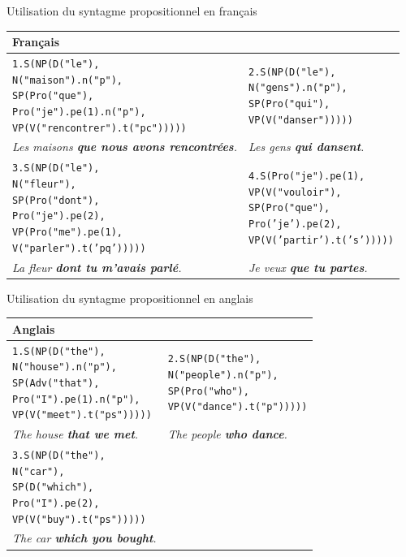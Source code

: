 \documentclass[11pt]{article} %
\newcommand{\real}[1]{\emph{#1}}
\begin{document}
\begin{example}
\caption{Utilisation du syntagme propositionnel en français}
\begin{tabular}{p{8cm} | p{6.2cm}}
\hline 
\textbf{Français} \\
\hline
\begin{alltt}
1.S(NP(D("le"),
       N("maison").n("p"),
       SP(Pro("que"),
          Pro("je").pe(1).n("p"),
          VP(V("rencontrer").t("pc")))))
\end{alltt} &
\begin{alltt}
2.S(NP(D("le"),
       N("gens").n("p"),
       SP(Pro("qui"),
          VP(V("danser")))))
\end{alltt} \\
\real{Les maisons \textbf{que nous avons rencontrées}.} & \real{Les gens \textbf{qui dansent}.} \\
\hline
\begin{alltt}
3.S(NP(D("le"),
       N("fleur"),
       SP(Pro("dont"),
          Pro("je").pe(2),
          VP(Pro("me").pe(1),
             V("parler").t('pq')))))
\end{alltt} &
\begin{alltt}
4.S(Pro("je").pe(1),
    VP(V("vouloir"),
       SP(Pro("que"),
          Pro('je').pe(2),
          VP(V('partir').t('s')))))
\end{alltt} \\
\real{La fleur \textbf{dont tu m'avais parlé}.} & \real{Je veux \textbf{que tu partes}.} \\
\end{tabular}
\label{exPropFr}
\end{example}
\begin{example}
\caption{Utilisation du syntagme propositionnel en anglais}
\begin{tabular}{p{7cm} | p{7cm}}
\hline
\textbf{Anglais} \\
\hline
\begin{alltt}
1.S(NP(D("the"),
       N("house").n("p"),
       SP(Adv("that"),
          Pro("I").pe(1).n("p"),
          VP(V("meet").t("ps")))))
\end{alltt} &
\begin{alltt}
2.S(NP(D("the"),
       N("people").n("p"),
       SP(Pro("who"),
          VP(V("dance").t("p")))))
\end{alltt} \\
\real{The house \textbf{that we met}.} & \real{The people \textbf{who dance}.} \\
\hline
\begin{alltt}
3.S(NP(D("the"),
       N("car"),
       SP(D("which"),
          Pro("I").pe(2),
          VP(V("buy").t("ps")))))
\end{alltt} \\
\real{The car \textbf{which you bought}.}
\end{tabular}
\label{exPropEn}
\end{example}
\end{document}

